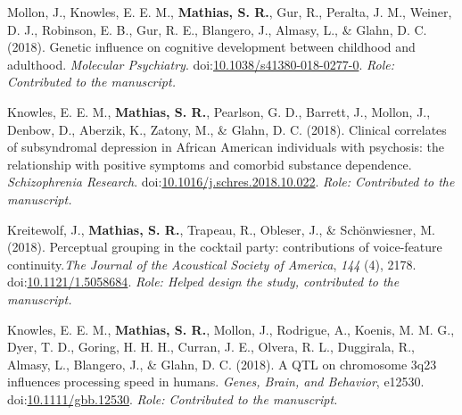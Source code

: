 \documentclass[10pt]{article}
\makeatletter
\newlength{\bibhang}
\newlength{\bibsep}
 {\@listi \global\bibsep\itemsep \global\advance\bibsep by\parsep}
\newenvironment{bibsection}%
        {\vspace{-\baselineskip}\begin{list}{}{%
       \setlength{\leftmargin}{\bibhang}%
       \setlength{\itemindent}{-\leftmargin}%
       \setlength{\itemsep}{\bibsep}%
       \setlength{\parsep}{\z@}%
        \setlength{\partopsep}{0pt}%
        \setlength{\topsep}{0pt}}}
        {\end{list}\vspace{-.6\baselineskip}}
\newcommand\doilink[1]{\href{http://dx.doi.org/#1}{#1}}
\newcommand\doi[1]{doi:\doilink{#1}}
\makeatother
\begin{document}
\begin{bibsection}
\item Mollon, J., Knowles, E. E. M.,  \textbf{Mathias, S. R.}, Gur, R., Peralta, J. M., Weiner, D. J., Robinson, E. B., Gur, R. E., Blangero, J., Almasy, L., \& Glahn, D. C. (2018). Genetic influence on cognitive development between childhood and adulthood. \emph{Molecular Psychiatry}. \doi{10.1038/s41380-018-0277-0}. \emph{Role: Contributed to the manuscript.}

\item Knowles, E. E. M., \textbf{Mathias, S. R.}, Pearlson, G. D., Barrett, J., Mollon, J., Denbow, D., Aberzik, K., Zatony, M., \& Glahn, D. C. (2018). Clinical correlates of subsyndromal depression in African American individuals with psychosis: the relationship with positive symptoms and comorbid substance dependence. \emph{Schizophrenia Research}. \doi{10.1016/j.schres.2018.10.022}. \emph{Role: Contributed to the manuscript.}

\item Kreitewolf, J., \textbf{Mathias, S. R.}, Trapeau, R., Obleser, J., \& Schönwiesner, M. (2018). Perceptual grouping in the cocktail party: contributions of voice-feature continuity.\emph{The Journal of the Acoustical Society of America}, \emph{144} (4), 2178. \doi{10.1121/1.5058684}.  \emph{Role: Helped design the study, contributed to the manuscript.}

\item Knowles, E. E. M., \textbf{Mathias, S. R.}, Mollon, J., Rodrigue, A., Koenis, M. M. G., Dyer, T. D., Goring, H. H. H., Curran, J. E., Olvera, R. L., Duggirala, R., Almasy, L., Blangero, J., \& Glahn, D. C. (2018). A QTL on chromosome 3q23 influences processing speed in humans. \emph{Genes, Brain, and Behavior}, e12530. \doi{10.1111/gbb.12530}. \emph{Role: Contributed to the manuscript.}


\end{bibsection}
\end{document}
